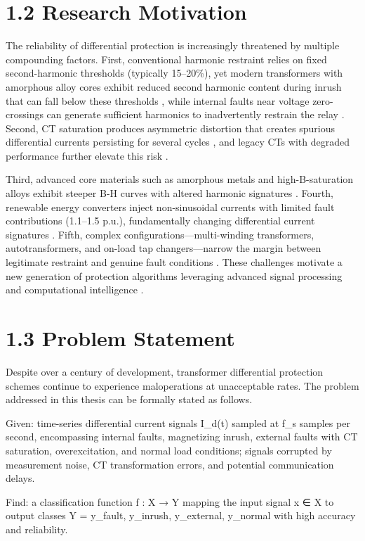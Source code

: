 \section{1.2  Research Motivation}
The reliability of differential protection is increasingly threatened by multiple compounding factors. First, conventional harmonic restraint relies on fixed second-harmonic thresholds (typically 15--20\%), yet modern transformers with amorphous alloy cores exhibit reduced second harmonic content during inrush that can fall below these thresholds \cite{ref7}, while internal faults near voltage zero-crossings can generate sufficient harmonics to inadvertently restrain the relay \cite{ref8}. Second, CT saturation produces asymmetric distortion that creates spurious differential currents persisting for several cycles \cite{ref9}, and legacy CTs with degraded performance further elevate this risk \cite{ref10}.

Third, advanced core materials such as amorphous metals and high-B-saturation alloys exhibit steeper B-H curves with altered harmonic signatures \cite{ref11}. Fourth, renewable energy converters inject non-sinusoidal currents with limited fault contributions (1.1--1.5 p.u.), fundamentally changing differential current signatures \cite{ref12}. Fifth, complex configurations---multi-winding transformers, autotransformers, and on-load tap changers---narrow the margin between legitimate restraint and genuine fault conditions \cite{ref13}. These challenges motivate a new generation of protection algorithms leveraging advanced signal processing and computational intelligence \cite{ref14}.


\section{1.3  Problem Statement}
Despite over a century of development, transformer differential protection schemes continue to experience maloperations at unacceptable rates. The problem addressed in this thesis can be formally stated as follows.

Given: time-series differential current signals {I\_d(t)} sampled at f\_s samples per second, encompassing internal faults, magnetizing inrush, external faults with CT saturation, overexcitation, and normal load conditions; signals corrupted by measurement noise, CT transformation errors, and potential communication delays.

Find: a classification function f : X → Y mapping the input signal x ∈ X to output classes Y = {y\_fault, y\_inrush, y\_external, y\_normal} with high accuracy and reliability.

